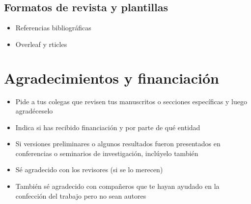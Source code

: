 \documentclass[
]{book}
\providecommand{\tightlist}{%
  \setlength{\itemsep}{0pt}\setlength{\parskip}{0pt}}
\begin{document}
\hypertarget{formatos-de-revista-y-plantillas}{%
\section{Formatos de revista y plantillas}\label{formatos-de-revista-y-plantillas}}

\begin{itemize}
\tightlist
\item
  Referencias bibliográficas
\item
  Overleaf y rticles
\end{itemize}

\hypertarget{agradecimientos-y-financiaciuxf3n}{%
\chapter{Agradecimientos y financiación}\label{agradecimientos-y-financiaciuxf3n}}

\begin{itemize}
\tightlist
\item
  Pide a tus colegas que revisen tus manuscritos o secciones específicas y luego agradéceselo
\item
  Indica si has recibido financiación y por parte de qué entidad
\item
  Si versiones preliminares o algunos resultados fueron presentados en conferencias o seminarios de investigación, inclúyelo también
\item
  Sé agradecido con los revisores (si se lo merecen)
\item
  También sé agradecido con compañeros que te hayan ayudado en la confección del trabajo pero no sean autores
\end{itemize}

  
\end{document}
